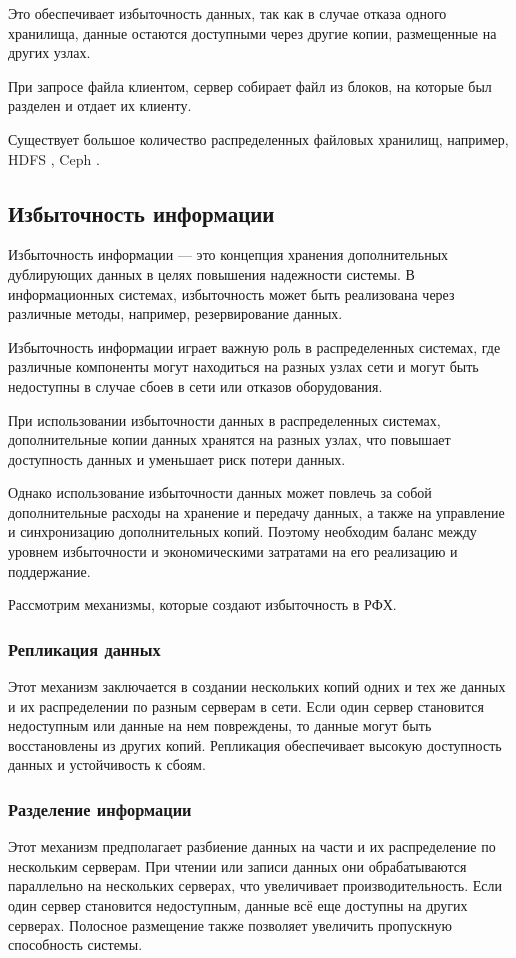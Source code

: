 Это обеспечивает избыточность данных, так как в случае отказа одного хранилища, данные остаются доступными через другие копии, размещенные на других узлах.

При запросе файла клиентом, сервер собирает файл из блоков, на которые был разделен и отдает их клиенту. 

Существует большое количество распределенных файловых хранилищ, например, HDFS \cite{hdfs}, Ceph \cite{ceph}.  

\subsection{Избыточность информации}
Избыточность информации --- это концепция хранения дополнительных дублирующих данных в целях повышения надежности системы. 
В информационных системах, избыточность может быть реализована через различные методы, например, резервирование данных.

Избыточность информации играет важную роль в распределенных системах, где различные компоненты могут находиться на разных узлах сети и могут быть недоступны в случае сбоев в сети или отказов оборудования. 

При использовании избыточности данных в распределенных системах, дополнительные копии данных хранятся на разных узлах, что повышает доступность данных и уменьшает риск потери данных.

Однако использование избыточности данных может повлечь за собой дополнительные расходы на хранение и передачу данных, а также на управление и синхронизацию дополнительных копий. 
Поэтому необходим баланс между уровнем избыточности и экономическими затратами на его реализацию и поддержание.

Рассмотрим механизмы, которые создают избыточность в РФХ.

\subsubsection{Репликация данных}
Этот механизм заключается в создании нескольких копий одних и тех же данных и их распределении по разным серверам в сети. Если один сервер становится недоступным или данные на нем повреждены, то данные могут быть восстановлены из других копий. Репликация обеспечивает высокую доступность данных и устойчивость к сбоям.

\subsubsection{Разделение информации}
Этот механизм предполагает разбиение данных на части и их распределение по нескольким серверам. При чтении или записи данных они обрабатываются параллельно на нескольких серверах, что увеличивает производительность. Если один сервер становится недоступным, данные всё еще доступны на других серверах. Полосное размещение также позволяет увеличить пропускную способность системы.
\newpage
